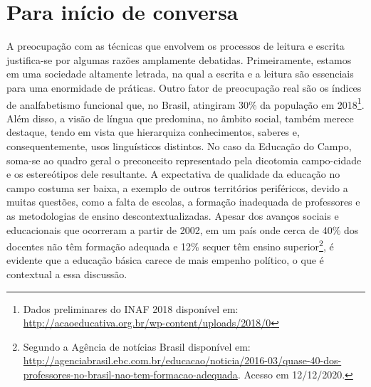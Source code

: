 \documentclass{textolivre}
\begin{document}
\begin{polyabstract}
\begin{english}
\begin{abstract}
\end{abstract}
\end{english}

\end{polyabstract}


\section{Para início de conversa}\label{sec-intro}
A preocupação com as técnicas que envolvem os processos de leitura e escrita justifica-se por algumas razões amplamente debatidas. Primeiramente, estamos em uma sociedade altamente letrada, na qual a escrita e a leitura são essenciais para uma enormidade de práticas. Outro fator de preocupação real são os índices de analfabetismo funcional que, no Brasil, atingiram 30\% da população em 2018\footnote{Dados preliminares do INAF 2018 disponível em: \url{http://acaoeducativa.org.br/wp-content/uploads/2018/0}}. Além disso, a visão de língua que predomina,  no âmbito social, também merece destaque, tendo em vista que hierarquiza conhecimentos, saberes e, consequentemente, usos linguísticos distintos. No caso da Educação do Campo, soma-se ao quadro geral o preconceito representado pela dicotomia campo-cidade e os estereótipos dele resultante. A expectativa de qualidade da educação no campo costuma ser baixa, a exemplo de outros territórios periféricos, devido a muitas questões, como a falta de escolas, a formação inadequada de professores e as metodologias de ensino descontextualizadas. Apesar dos avanços sociais e educacionais que ocorreram a partir de 2002, em um país onde cerca de 40\% dos docentes não têm formação adequada e 12\% sequer têm ensino superior\footnote{Segundo a Agência de notícias Brasil disponível em: \url{http://agenciabrasil.ebc.com.br/educacao/noticia/2016-03/quase-40-dos-professores-no-brasil-nao-tem-formacao-adequada}. Acesso em 12/12/2020.}, é evidente que a educação básica carece de mais empenho político, o que é contextual a essa discussão.
\end{document}
